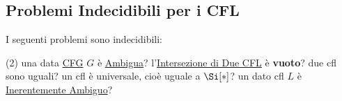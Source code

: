 %
\subsection{Problemi Indecidibili per i CFL}\label{sub:ll_problemi_indecidibili_per_i_cfl} %
I seguenti problemi sono indecidibili:
\begin{tasks}(2)    
    \task una data \hyperref[def:cfg]{CFG} $G$ è \hyperref[def:ambiguita]{Ambigua}?
    \task l'\hyperref[sub:ll_intersezione_tra_due_cfl]{Intersezione di Due CFL} è \textbf{vuoto}?
    \task due \ac{cfl} sono uguali?
    \task un \ac{cfl} è universale, cioè uguale a $\Si[*]$?
    \task un dato \ac{cfl} $L$ è \hyperref[def:ambig-inerente]{Inerentemente Ambiguo}?
\end{tasks}
%
